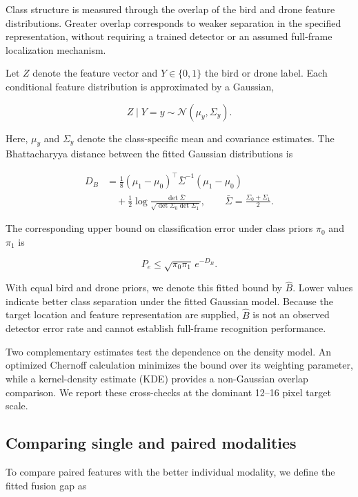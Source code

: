 \documentclass[10pt]{article}
\newcommand{\Bhat}{\widehat B}
\begin{document}
Class structure is measured through the overlap of the bird and drone feature distributions. Greater overlap corresponds to weaker separation in the specified representation, without requiring a trained detector or an assumed full-frame localization mechanism.

Let $Z$ denote the feature vector and $Y\in\{0,1\}$ the bird or drone label. Each conditional feature distribution is approximated by a Gaussian,

\begin{equation}
Z \mid Y=y \sim \mathcal{N}(\mu_y,\Sigma_y).
\end{equation}

Here, $\mu_y$ and $\Sigma_y$ denote the class-specific mean and covariance estimates. The Bhattacharyya distance between the fitted Gaussian distributions is

\begin{align}
D_B
&=
\frac{1}{8}
(\mu_1-\mu_0)^\top
\bar{\Sigma}^{-1}
(\mu_1-\mu_0)
\\
&\quad+
\frac{1}{2}
\log
\frac{\det\bar{\Sigma}}
{\sqrt{\det\Sigma_0\det\Sigma_1}},
\qquad
\bar{\Sigma}
=
\frac{\Sigma_0+\Sigma_1}{2}.
\end{align}

The corresponding upper bound on classification error under class priors $\pi_0$ and $\pi_1$ is

\begin{equation}
P_e
\leq
\sqrt{\pi_0\pi_1}\,
e^{-D_B}.
\label{eq:bhatt}
\end{equation}

With equal bird and drone priors, we denote this fitted bound by $\Bhat$. Lower values indicate better class separation under the fitted Gaussian model. Because the target location and feature representation are supplied, $\Bhat$ is not an observed detector error rate and cannot establish full-frame recognition performance.

Two complementary estimates test the dependence on the density model. An optimized Chernoff calculation minimizes the bound over its weighting parameter, while a kernel-density estimate (KDE) provides a non-Gaussian overlap comparison. We report these cross-checks at the dominant 12--16 pixel target scale.

\subsection{Comparing single and paired modalities}

To compare paired features with the better individual modality, we define the fitted fusion gap as
\end{document}
